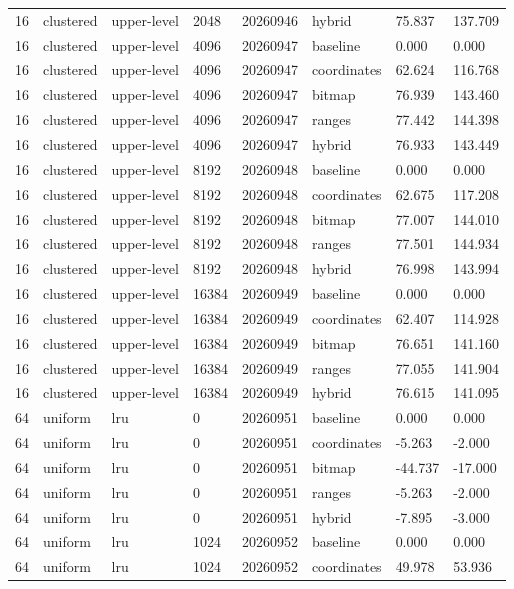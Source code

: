 \begin{tabular}{llllllll}
16 & clustered & upper-level & 2048 & 20260946 & hybrid & 75.837 & 137.709 \\
16 & clustered & upper-level & 4096 & 20260947 & baseline & 0.000 & 0.000 \\
16 & clustered & upper-level & 4096 & 20260947 & coordinates & 62.624 & 116.768 \\
16 & clustered & upper-level & 4096 & 20260947 & bitmap & 76.939 & 143.460 \\
16 & clustered & upper-level & 4096 & 20260947 & ranges & 77.442 & 144.398 \\
16 & clustered & upper-level & 4096 & 20260947 & hybrid & 76.933 & 143.449 \\
16 & clustered & upper-level & 8192 & 20260948 & baseline & 0.000 & 0.000 \\
16 & clustered & upper-level & 8192 & 20260948 & coordinates & 62.675 & 117.208 \\
16 & clustered & upper-level & 8192 & 20260948 & bitmap & 77.007 & 144.010 \\
16 & clustered & upper-level & 8192 & 20260948 & ranges & 77.501 & 144.934 \\
16 & clustered & upper-level & 8192 & 20260948 & hybrid & 76.998 & 143.994 \\
16 & clustered & upper-level & 16384 & 20260949 & baseline & 0.000 & 0.000 \\
16 & clustered & upper-level & 16384 & 20260949 & coordinates & 62.407 & 114.928 \\
16 & clustered & upper-level & 16384 & 20260949 & bitmap & 76.651 & 141.160 \\
16 & clustered & upper-level & 16384 & 20260949 & ranges & 77.055 & 141.904 \\
16 & clustered & upper-level & 16384 & 20260949 & hybrid & 76.615 & 141.095 \\
64 & uniform & lru & 0 & 20260951 & baseline & 0.000 & 0.000 \\
64 & uniform & lru & 0 & 20260951 & coordinates & -5.263 & -2.000 \\
64 & uniform & lru & 0 & 20260951 & bitmap & -44.737 & -17.000 \\
64 & uniform & lru & 0 & 20260951 & ranges & -5.263 & -2.000 \\
64 & uniform & lru & 0 & 20260951 & hybrid & -7.895 & -3.000 \\
64 & uniform & lru & 1024 & 20260952 & baseline & 0.000 & 0.000 \\
64 & uniform & lru & 1024 & 20260952 & coordinates & 49.978 & 53.936 \\

\end{tabular}
